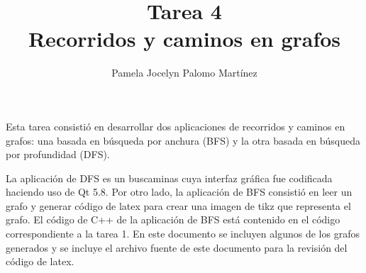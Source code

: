 \documentclass[]{article}
\title{Tarea 4\\Recorridos y caminos en grafos}
\author{Pamela Jocelyn Palomo Mart\'inez}
\date{}
\begin{document}
\maketitle

Esta tarea consisti\'o en desarrollar dos aplicaciones de recorridos y caminos en grafos: una basada en b\'usqueda por anchura (BFS) y la otra basada en b\'usqueda por profundidad (DFS).

La aplicaci\'on de DFS es un buscaminas cuya interfaz gr\'afica fue codificada haciendo uso de Qt 5.8. Por otro lado, la aplicación de BFS consistió en leer un grafo y generar código de latex para crear una imagen de tikz que representa el grafo. El c\'odigo de C++ de la aplicación de BFS est\'a contenido en el código correspondiente a la tarea 1. En este documento se incluyen algunos de los grafos generados y se incluye el archivo fuente de este documento para la revisión del c\'odigo de latex.

\centering
{}
\end{document}
